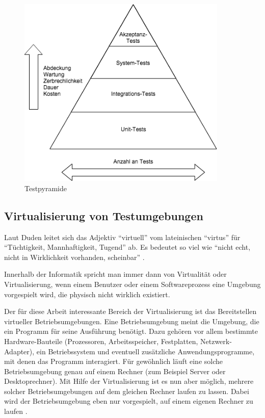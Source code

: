 \begin{figure}[!ht]
  \begin{center}
    \includegraphics[width=10cm]{bilder/testpyramide.png}
    \caption{Testpyramide \citep[Vgl.][]{testpyramide}}
  \end{center}
\end{figure}



\subsection{Virtualisierung von Testumgebungen}

Laut Duden leitet sich das Adjektiv "`virtuell"' vom lateinischen "`virtus"' für "`Tüchtigkeit, Mannhaftigkeit, Tugend"' ab. Es bedeutet so viel wie "`nicht echt, nicht in Wirklichkeit vorhanden, scheinbar"' \citep[Vgl.][]{duden:001}.

Innerhalb der Informatik spricht man immer dann von Virtualität oder Virtualisierung, wenn einem Benutzer oder einem Softwareprozess eine Umgebung vorgespielt wird, die physisch nicht wirklich existiert.

Der für diese Arbeit interessante Bereich der Virtualisierung ist das Bereitstellen virtueller Betriebsumgebungen. Eine Betriebsumgebung meint die Umgebung, die ein Programm für seine Ausführung benötigt. Dazu gehören vor allem bestimmte Hardware-Bauteile (Prozessoren, Arbeitsspeicher, Festplatten, Netzwerk-Adapter), ein Betriebssystem und eventuell zusätzliche Anwendungsprogramme, mit denen das Programm interagiert. Für gewöhnlich läuft eine solche Betriebsumgebung genau auf einem Rechner (zum Beispiel Server oder Desktoprechner). Mit Hilfe der Virtualisierung ist es nun aber möglich, mehrere solcher Betriebsumgebungen auf dem gleichen Rechner laufen zu lassen. Dabei wird der Betriebsumgebung eben nur vorgespielt, auf einem eigenen Rechner zu laufen \citep[Vgl.][Abstract]{DamMohAnd12}.

